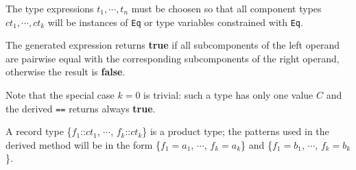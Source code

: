The type expressions $t_1, \cdots, t_n$ must be choosen so that all component types $ct_1, \cdots, ct_k$ will be instances of \texttt{Eq} or type variables constrained with \texttt{Eq}.

The generated expression returns \textbf{true} if all subcomponents of the left operand are pairwise equal with the corresponding subcomponents of the right operand, otherwise the result is  \textbf{false}.

Note that the special case $k=0$ is trivial: such a type has only one value $C$ and the derived \texttt{==} returns always \textbf{true}.

A record type \{$f_1$::$ct_1$, $\cdots$, $f_k$::$ct_k$\} is a product type; the patterns used in the derived method will be in the form \{$f_1=a_1$, $\cdots$, $f_k=a_k$\} and \{$f_1=b_1$, $\cdots$, $f_k=b_k$\}.

